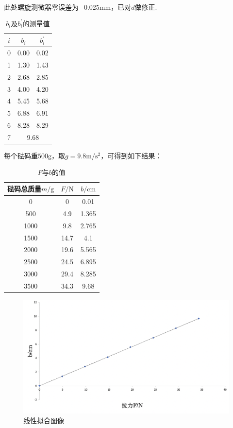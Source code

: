 \documentclass[UTF8]{ctexart}
\begin{document}
此处螺旋测微器零误差为$-0.025\mathrm{mm}$，已对$d$做修正.
\begin{table}[H]\centering
    \begin{tabular}{ccc}
        \hline\hline
        $i$ & $b_i$ & $b_i^{'}$\\
        \hline
        0&0.00&0.02\\
        1&1.30&1.43\\
        2&2.68&2.85\\
        3&4.00&4.20\\
        4&5.45&5.68\\
        5&6.88&6.91\\
        6&8.28&8.29\\
        7&\multicolumn{2}{c}{9.68}\\
        \hline\hline
    \end{tabular}
    \caption{$b_i$及$b_i^{'}$的测量值}
\end{table}
每个砝码重$500\mathrm{g}$，取$g=9.8\mathrm{m/s^2}$，可得到如下结果：
\begin{table}[H]\centering
    \begin{tabular}{ccc}
        \hline\hline
        砝码总质量$m/\mathrm{g}$ & $F/\mathrm{N}$ & $b/\mathrm{cm}$\\
        \hline
        0&0&0.01\\
        500&4.9&1.365\\
        1000&9.8&2.765\\
        1500&14.7&4.1\\
        2000&19.6&5.565\\
        2500&24.5&6.895\\
        3000&29.4&8.285\\
        3500&34.3&9.68\\
        \hline\hline
    \end{tabular}
    \caption{$F$与$b$的值}
\end{table}

\begin{figure}[h]
    \centering
    \includegraphics[scale=0.5]{4.png}
    \caption{线性拟合图像}
\end{figure}
\end{document}
